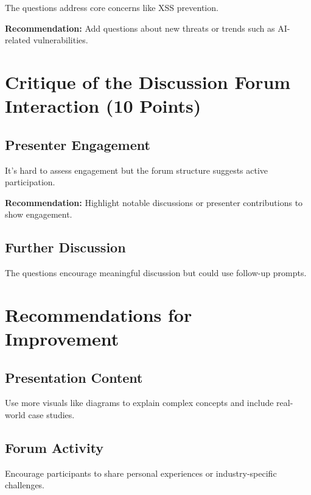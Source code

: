 \documentclass{article}
\begin{document}
The questions address core concerns like XSS prevention.

\textbf{Recommendation:} Add questions about new threats or trends such as AI-related vulnerabilities.

\section{Critique of the Discussion Forum Interaction (10 Points)}

\subsection{Presenter Engagement}

It's hard to assess engagement but the forum structure suggests active participation.

\textbf{Recommendation:} Highlight notable discussions or presenter contributions to show engagement.

\subsection{Further Discussion}

The questions encourage meaningful discussion but could use follow-up prompts.

\section{Recommendations for Improvement}

\subsection{Presentation Content}

Use more visuals like diagrams to explain complex concepts and include real-world case studies.

\subsection{Forum Activity}

Encourage participants to share personal experiences or industry-specific challenges.
\end{document}
